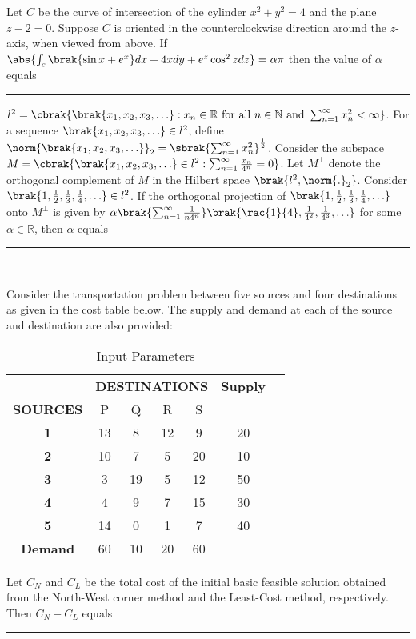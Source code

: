 \item{
Let $C$ be the curve of intersection of the cylinder $x^2+y^2=4$ and the plane $z-2=0$. Suppose $C$ is oriented in the counterclockwise direction around the $z$-axis, when viewed from above. If $\abs{\int_c\brak{\sin x+e^x}dx+4xdy+e^z\cos^2zdz}=\alpha\pi$ then the value of $\alpha$ equals \rule{2cm}{0.15mm}
}
\item{
$l^2 = \cbrak{\brak{x_1, x_2, x_3, \ldots} : x_n \in \mathbb{R} \text{ for all } n \in \mathbb{N} \text{ and } \sum_{n=1}^{\infty} x_n^2 < \infty}$.
For a sequence $\brak{x_1, x_2, x_3, \ldots} \in l^2$, define $\norm{\brak{x_1, x_2, x_3, \ldots}}_2 = \sbrak{\sum_{n=1}^{\infty} x_n^2}^{\frac{1}{2}}$.
Consider the subspace $ M = \cbrak{\brak{x_1, x_2, x_3, \ldots} \in l^2 : \sum_{n=1}^{\infty} \frac{x_n}{4^n} = 0} $. Let $M^\perp$ denote the orthogonal complement of $M$ in the Hilbert space $\brak{l^2,\norm{.}_2}$. Consider $\brak{1,\frac{1}{2},\frac{1}{3},\frac{1}{4},\hdots}\in l^2$. If the orthogonal projection of $\brak{1,\frac{1}{2},\frac{1}{3},\frac{1}{4},\hdots}$ onto $M^\perp$ is given by $\alpha\brak{\sum_{n=1}^{\infty}\frac{1}{n4^n}}\brak{\rac{1}{4},\frac{1}{	4^2},\frac{1}{4^3},\hdots}$ for some $\alpha\in\mathbb{R}$, then $\alpha$ equals \rule{2cm}{0.15mm}\\
}
\item{
Consider the transportation problem between five sources and four destinations as given in the cost table below. The supply and demand at each of the source and destination are also provided:
\begin{table}[h!]    
  \centering
  \begin{table}[H]
    \centering
    \begin{tabular}{|c|c|c|c|c|c|c|}
        \hline
        & \multicolumn{4}{c|}{\textbf{DESTINATIONS}} & \textbf{Supply} \\ \cline{2-5}
        \textbf{SOURCES} & P & Q & R & S & \\ \hline
        \textbf{1} & 13 & 8 & 12 & 9 & 20 \\ \hline
        \textbf{2} & 10 & 7 & 5 & 20 & 10 \\ \hline
        \textbf{3} & 3 & 19 & 5 & 12 & 50 \\ \hline
        \textbf{4} & 4 & 9 & 7 & 15 & 30 \\ \hline
        \textbf{5} & 14 & 0 & 1 & 7 & 40 \\ \hline
        \textbf{Demand} & 60 & 10 & 20 & 60 & \\ \hline
    \end{tabular}
\end{table} 
  \caption{Input Parameters}
\end{table}

Let $C_N$ and $C_L$ be the total cost of the initial basic feasible solution obtained from the North-West corner method and the Least-Cost method, respectively. Then $C_N-C_L$ equals \rule{2cm}{0.15mm}
}

